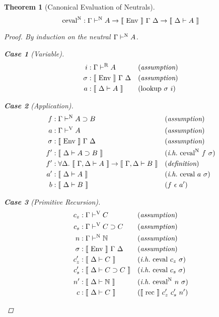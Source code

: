 \documentclass{llncs}
\newtheorem{subtheorem}{Theorem}
\newtheorem{scase}{Case}
\def\arr{\supset}
\def\marr{\rightarrow}
\def\nat{\mathbb{N}}
\def\emp{\epsilon}
\def\rec{\fun{rec}}
\def\cevalv{\fun{ceval}}
\def\cevaln{\fun{ceval}^\con{N}}
\def\lookup{\fun{lookup}}
\def\bydef{(\textit{definition})}
\def\byass{(\textit{assumption})}
\newcommand{\ih}[1]{(\textit{i.h.}~ #1)}
\newcommand{\by}[1]{(#1)}
\newcommand{\turn}[1]{\vdash^\con{#1}}
\newcommand{\all}[1]{\forall#1.~}
\newcommand{\el}[1]{\llbracket ~ #1 ~ \rrbracket}
\newcommand{\con}[1]{\textmd{#1}}
\newcommand{\fun}[1]{\textmd{#1}}
\newcommand{\dtypm}[1]{\el{\Delta \vdash #1}}
\newcommand{\gdtypm}[1]{\el{\Gamma, \Delta \vdash #1}}
\newcommand{\typv}[1]{\Gamma \turn{V} #1}
\newcommand{\typn}[1]{\Gamma \turn{N} #1}
\newcommand{\typr}[1]{\Gamma \turn{R} #1}
\def\menv{\el{\fun{Env}}~\Gamma~\Delta}
\begin{document}
\begin{subtheorem}[Canonical Evaluation of Neutrals]
\label{thm:mod:cevaln}
$$
\cevaln : \typn{A} \marr \menv \marr \dtypm{A}
$$

\begin{proof}

By induction on the neutral $\typn{A}$.

\begin{scase}[Variable]
\begin{align*}
i   &: \typr{A} && \byass\\
\sigma  &: \menv && \byass\\
a  &: \dtypm{A} && \by{\lookup~\sigma~i}
\end{align*}
\end{scase}

\begin{scase}[Application]
\begin{align*}
f   &: \typn{A \arr B} && \byass\\
a   &: \typv{A} && \byass\\
\sigma  &: \menv && \byass\\
f'  &: \dtypm{A \arr B} && \ih{\cevaln~f~\sigma}\\
f'  &: \all{\Delta} \gdtypm{A} \marr \gdtypm{B} && \bydef\\
a'  &: \dtypm{A} && \ih{\cevalv~a~\sigma}\\
b   &: \dtypm{B} && \by{f~\emp~a'}
\end{align*}
\end{scase}

\begin{scase}[Primitive Recursion]
\begin{align*}
c_z  &: \typv{C} && \byass\\
c_s  &: \typv{C \arr C} && \byass\\
n    &: \typn{\nat} && \byass\\
\sigma  &: \menv && \byass\\
c_z' &: \dtypm{C} && \ih{\cevalv~c_z~\sigma}\\
c_s' &: \dtypm{C \arr C} && \ih{\cevalv~c_s~\sigma}\\
n'   &: \dtypm{\nat} && \ih{\cevaln~n~\sigma}\\
c    &: \dtypm{C} && \by{\el{\rec}~c_z'~c_s'~n'}
\end{align*}
\end{scase}

\end{proof}

\end{subtheorem}
\end{document}
